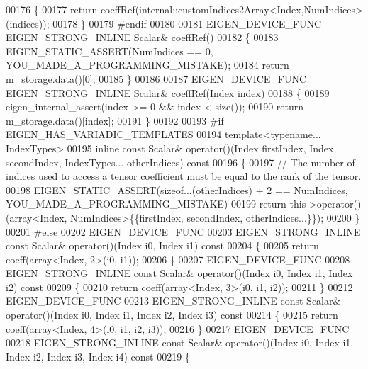 \begin{DoxyCode}
00176     \{
00177         \textcolor{keywordflow}{return} coeffRef(internal::customIndices2Array<Index,NumIndices>(indices));
00178     \}
00179 \textcolor{preprocessor}{#endif}
00180 
00181     EIGEN\_DEVICE\_FUNC EIGEN\_STRONG\_INLINE Scalar& coeffRef()
00182     \{
00183       EIGEN\_STATIC\_ASSERT(NumIndices == 0, YOU\_MADE\_A\_PROGRAMMING\_MISTAKE);
00184       \textcolor{keywordflow}{return} m\_storage.data()[0];
00185     \}
00186 
00187     EIGEN\_DEVICE\_FUNC EIGEN\_STRONG\_INLINE Scalar& coeffRef(Index index)
00188     \{
00189       eigen\_internal\_assert(index >= 0 && index < size());
00190       \textcolor{keywordflow}{return} m\_storage.data()[index];
00191     \}
00192 
00193 \textcolor{preprocessor}{#if EIGEN\_HAS\_VARIADIC\_TEMPLATES}
00194     \textcolor{keyword}{template}<\textcolor{keyword}{typename}... IndexTypes>
00195     \textcolor{keyword}{inline} \textcolor{keyword}{const} Scalar& operator()(Index firstIndex, Index secondIndex, IndexTypes... otherIndices)\textcolor{keyword}{ const}
00196 \textcolor{keyword}{    }\{
00197       \textcolor{comment}{// The number of indices used to access a tensor coefficient must be equal to the rank of the tensor.}
00198       EIGEN\_STATIC\_ASSERT(\textcolor{keyword}{sizeof}...(otherIndices) + 2 == NumIndices, YOU\_MADE\_A\_PROGRAMMING\_MISTAKE)
00199       \textcolor{keywordflow}{return} this->operator()(array<Index, NumIndices>\{\{firstIndex, secondIndex, otherIndices...\}\});
00200     \}
00201 \textcolor{preprocessor}{#else}
00202     EIGEN\_DEVICE\_FUNC
00203     EIGEN\_STRONG\_INLINE \textcolor{keyword}{const} Scalar& operator()(Index i0, Index i1)\textcolor{keyword}{ const}
00204 \textcolor{keyword}{    }\{
00205       \textcolor{keywordflow}{return} coeff(array<Index, 2>(i0, i1));
00206     \}
00207     EIGEN\_DEVICE\_FUNC
00208     EIGEN\_STRONG\_INLINE \textcolor{keyword}{const} Scalar& operator()(Index i0, Index i1, Index i2)\textcolor{keyword}{ const}
00209 \textcolor{keyword}{    }\{
00210       \textcolor{keywordflow}{return} coeff(array<Index, 3>(i0, i1, i2));
00211     \}
00212     EIGEN\_DEVICE\_FUNC
00213     EIGEN\_STRONG\_INLINE \textcolor{keyword}{const} Scalar& operator()(Index i0, Index i1, Index i2, Index i3)\textcolor{keyword}{ const}
00214 \textcolor{keyword}{    }\{
00215       \textcolor{keywordflow}{return} coeff(array<Index, 4>(i0, i1, i2, i3));
00216     \}
00217     EIGEN\_DEVICE\_FUNC
00218     EIGEN\_STRONG\_INLINE \textcolor{keyword}{const} Scalar& operator()(Index i0, Index i1, Index i2, Index i3, Index i4)\textcolor{keyword}{ const}
00219 \textcolor{keyword}{    }\{

\end{DoxyCode}
